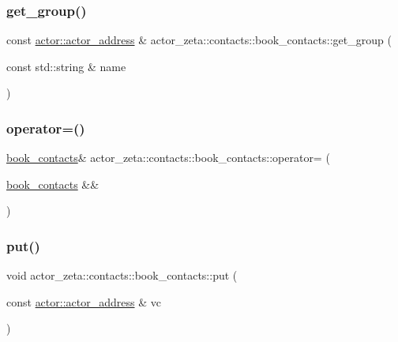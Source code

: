 \subsubsection{\texorpdfstring{get\+\_\+group()}{get\_group()}}
{\footnotesize\ttfamily const \hyperlink{classactor__zeta_1_1actor_1_1actor__address}{actor\+::actor\+\_\+address} \& actor\+\_\+zeta\+::contacts\+::book\+\_\+contacts\+::get\+\_\+group (\begin{DoxyParamCaption}\item[{const std\+::string \&}]{name }\end{DoxyParamCaption})}

\mbox{\label{classactor__zeta_1_1contacts_1_1book__contacts_ab61cdef0f457ecdd0c8adde0b8d2e3fc}} 
\subsubsection{\texorpdfstring{operator=()}{operator=()}}
{\footnotesize\ttfamily \hyperlink{classactor__zeta_1_1contacts_1_1book__contacts}{book\+\_\+contacts}\& actor\+\_\+zeta\+::contacts\+::book\+\_\+contacts\+::operator= (\begin{DoxyParamCaption}\item[{\hyperlink{classactor__zeta_1_1contacts_1_1book__contacts}{book\+\_\+contacts} \&\&}]{ }\end{DoxyParamCaption})\hspace{0.3cm}{\ttfamily [default]}}

\mbox{\label{classactor__zeta_1_1contacts_1_1book__contacts_a8ae49bfac18a50e9f7e4d1ac8abb1b48}} 
\subsubsection{\texorpdfstring{put()}{put()}}
{\footnotesize\ttfamily void actor\+\_\+zeta\+::contacts\+::book\+\_\+contacts\+::put (\begin{DoxyParamCaption}\item[{const \hyperlink{classactor__zeta_1_1actor_1_1actor__address}{actor\+::actor\+\_\+address} \&}]{vc }\end{DoxyParamCaption})}

